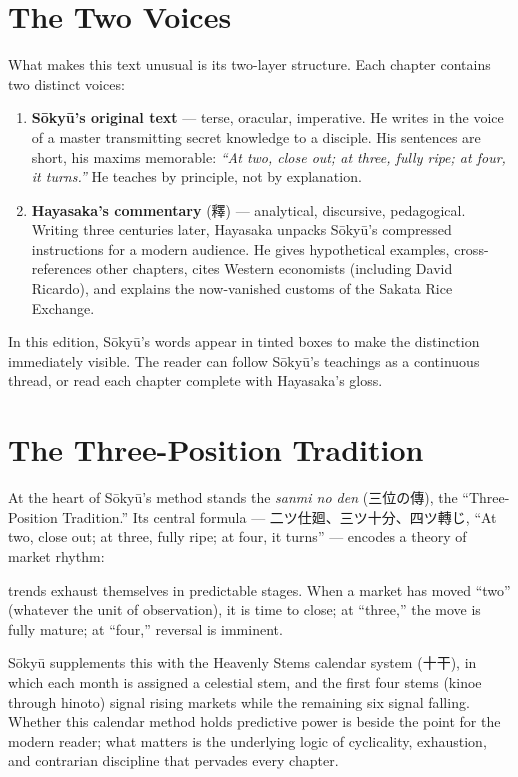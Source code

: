 \documentclass[10pt, openany]{book}
\newcommand{\jp}[1]{{\japanesefont #1}}
\begin{document}
\section*{The Two Voices}

What makes this text unusual is its two-layer structure. Each chapter
contains two distinct voices:

\begin{enumerate}
\item \textbf{S\=oky\=u's original text} --- terse, oracular,
  imperative. He writes in the voice of a master transmitting secret
  knowledge to a disciple. His sentences are short, his maxims memorable:
  \textit{``At two, close out; at three, fully ripe; at four, it
  turns.''} He teaches by principle, not by explanation.

\item \textbf{Hayasaka's commentary} (\jp{釋}) --- analytical,
  discursive, pedagogical. Writing three centuries later, Hayasaka
  unpacks S\=oky\=u's compressed instructions for a modern audience. He
  gives hypothetical examples, cross-references other chapters, cites
  Western economists (including David Ricardo), and explains the
  now-vanished customs of the Sakata Rice Exchange.
\end{enumerate}

In this edition, S\=oky\=u's words appear in tinted boxes to make the
distinction immediately visible. The reader can follow S\=oky\=u's
teachings as a continuous thread, or read each chapter complete with
Hayasaka's gloss.

\section*{The Three-Position Tradition}

\begin{sloppypar}
At the heart of S\=oky\=u's method stands the \textit{sanmi no den}
(\jp{三位の傳}), the ``Three-Position Tradition.'' Its central formula
--- \jp{二ツ仕廻、三ツ十分、四ツ轉じ}, ``At two, close out; at three,
fully ripe; at four, it turns'' --- encodes a theory of market rhythm:
\end{sloppypar}
trends exhaust themselves in predictable stages. When a market has moved
``two'' (whatever the unit of observation), it is time to close; at
``three,'' the move is fully mature; at ``four,'' reversal is imminent.

S\=oky\=u supplements this with the Heavenly Stems calendar system
(\jp{十干}), in which each month is assigned a celestial stem, and the
first four stems (kinoe through hinoto) signal rising markets while the
remaining six signal falling. Whether this calendar method holds
predictive power is beside the point for the modern reader; what matters
is the underlying logic of cyclicality, exhaustion, and contrarian
discipline that pervades every chapter.
\end{document}
